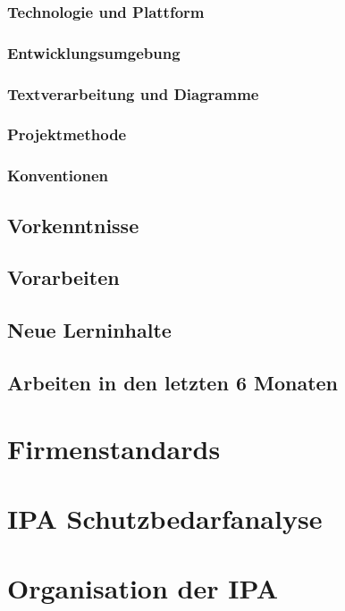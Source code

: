 \subsection{Technologie und Plattform}

\subsection{Entwicklungsumgebung}

\subsection{Textverarbeitung und Diagramme}

\subsection{Projektmethode}

\subsection{Konventionen}

\section{Vorkenntnisse}

\section{Vorarbeiten}

\section{Neue Lerninhalte}

\section{Arbeiten in den letzten 6 Monaten}

\chapter{Firmenstandards}

\chapter{IPA Schutzbedarfanalyse}

\chapter{Organisation der IPA}

